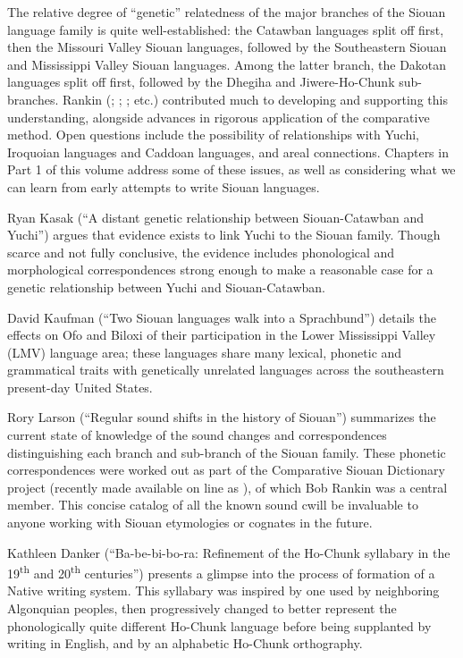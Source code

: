 \begin{refsection}

The relative degree of ``genetic'' relatedness of the major branches of the Siouan language family is quite well-established: the Catawban languages split off first, then the Missouri Valley Siouan languages, followed by the Southeastern Siouan and Mississippi Valley Siouan languages. Among the latter branch, the Dakotan languages split off first, followed by the Dhegiha and Jiwere-Ho-Chunk sub-branches. Rankin (\citeyear{Rankin1988}; \citeyear{Rankin1998macrosiouan}; \citealt{RankinEtAl1998}; etc.) contributed much to developing and supporting this understanding, alongside advances in rigorous application of the comparative method. Open questions include the possibility of relationships with Yuchi, Iroquoian languages and Caddoan languages, and areal connections. Chapters in Part 1 of this volume address some of these issues, as well as considering what we can learn from early attempts to write Siouan languages.

Ryan Kasak (``A distant genetic relationship between Siouan-Catawban and Yuchi'') argues that evidence exists to link Yuchi to the Siouan family. Though scarce and not fully conclusive, the evidence includes phonological and morphological correspondences strong enough to make a reasonable case for a genetic relationship between Yuchi and Siouan-Catawban. 

David Kaufman (``Two Siouan languages walk into a Sprachbund'') details the effects on Ofo and Biloxi of their participation in the Lower Mississippi Valley (LMV) language area; these languages share many lexical, phonetic and grammatical traits with genetically unrelated languages across the southeastern present-day United States. 

Rory Larson (``Regular sound shifts in the history of Siouan'') summarizes the current state of knowledge of the sound changes and correspondences distinguishing each branch and sub-branch of the Siouan family. These phonetic correspondences were worked out as part of the Comparative Siouan Dictionary project (recently made available on line as \citet{Rankinetal2015AccessSeptember}), of which Bob Rankin was a central member. This concise catalog of all the known sound cwill be invaluable to anyone working with Siouan etymologies or cognates in the future.

Kathleen Danker (``Ba-be-bi-bo-ra: Refinement of the Ho-Chunk syllabary in the 19\textsuperscript{th} and 20\textsuperscript{th} centuries'') presents a glimpse into the process of formation of a Native writing system. This syllabary was inspired by one used by neighboring Algonquian peoples, then progressively changed to better represent the phonologically quite different Ho-Chunk language before being supplanted by writing in English, and by an alphabetic Ho-Chunk orthography.


\end{refsection}
